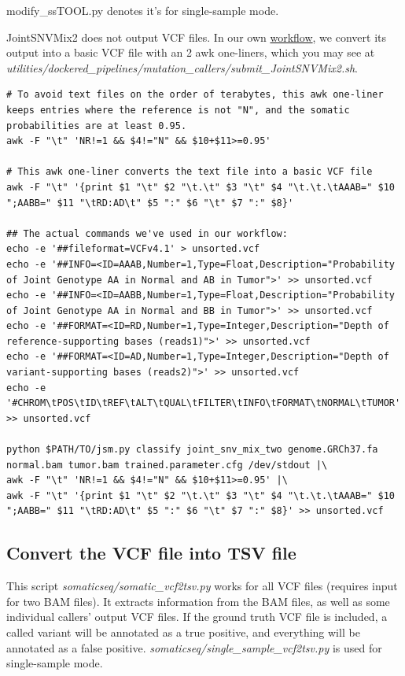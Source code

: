 \documentclass[10pt,letterpaper]{article}
\begin{document}
\begin{sloppypar}
modify\_ssTOOL.py denotes it's for single-sample mode. 

JointSNVMix2 does not output VCF files. In our own \href{https://github.com/bioinform/somaticseq/blob/master/utilities/dockered_pipelines/mutation_callers/submit_JointSNVMix2.sh}{workflow}, we convert its output into a basic VCF file with an 2 awk one-liners, which you may see at \textit{utilities/dockered\_pipelines/mutation\_callers/submit\_JointSNVMix2.sh}.

\begin{lstlisting}
# To avoid text files on the order of terabytes, this awk one-liner keeps entries where the reference is not "N", and the somatic probabilities are at least 0.95.
awk -F "\t" 'NR!=1 && $4!="N" && $10+$11>=0.95'
	
# This awk one-liner converts the text file into a basic VCF file
awk -F "\t" '{print $1 "\t" $2 "\t.\t" $3 "\t" $4 "\t.\t.\tAAAB=" $10 ";AABB=" $11 "\tRD:AD\t" $5 ":" $6 "\t" $7 ":" $8}'

## The actual commands we've used in our workflow:
echo -e '##fileformat=VCFv4.1' > unsorted.vcf
echo -e '##INFO=<ID=AAAB,Number=1,Type=Float,Description="Probability of Joint Genotype AA in Normal and AB in Tumor">' >> unsorted.vcf
echo -e '##INFO=<ID=AABB,Number=1,Type=Float,Description="Probability of Joint Genotype AA in Normal and BB in Tumor">' >> unsorted.vcf
echo -e '##FORMAT=<ID=RD,Number=1,Type=Integer,Description="Depth of reference-supporting bases (reads1)">' >> unsorted.vcf
echo -e '##FORMAT=<ID=AD,Number=1,Type=Integer,Description="Depth of variant-supporting bases (reads2)">' >> unsorted.vcf
echo -e '#CHROM\tPOS\tID\tREF\tALT\tQUAL\tFILTER\tINFO\tFORMAT\tNORMAL\tTUMOR' >> unsorted.vcf

python $PATH/TO/jsm.py classify joint_snv_mix_two genome.GRCh37.fa normal.bam tumor.bam trained.parameter.cfg /dev/stdout |\
awk -F "\t" 'NR!=1 && $4!="N" && $10+$11>=0.95' |\
awk -F "\t" '{print $1 "\t" $2 "\t.\t" $3 "\t" $4 "\t.\t.\tAAAB=" $10 ";AABB=" $11 "\tRD:AD\t" $5 ":" $6 "\t" $7 ":" $8}' >> unsorted.vcf
\end{lstlisting}
	




\subsection{Convert the VCF file into TSV file}
This script \textit{somaticseq/somatic\_vcf2tsv.py} works for all VCF files (requires input for two BAM files). It extracts information from the BAM files, as well as some individual callers' output VCF files. If the ground truth VCF file is included, a called variant will be annotated as a true positive, and everything will be annotated as a false positive. \textit{somaticseq/single\_sample\_vcf2tsv.py} is used for single-sample mode. 



\end{sloppypar}
\end{document}
